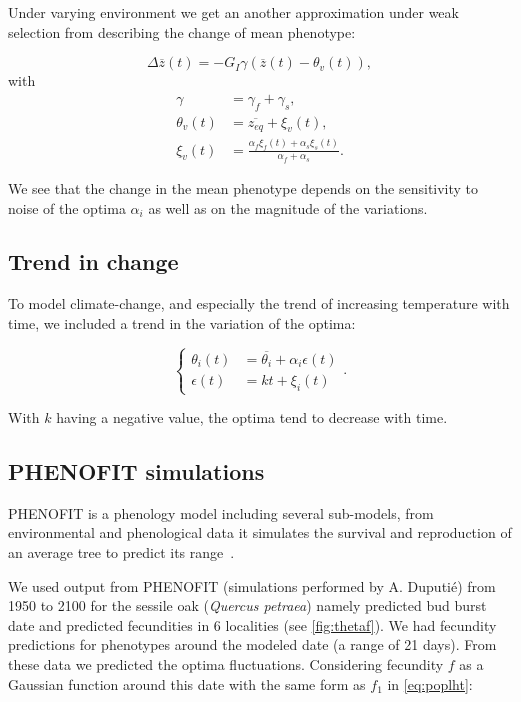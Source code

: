 Under varying environment we get an another approximation under weak selection from \citep{engen_evolution_2011} describing the change of mean phenotype:

\begin{equation}
	\label{eq:zfluct}
	\Delta \overline{z}(t) = - G_I \gamma (\overline{z}(t) - \theta_v(t)),
\end{equation}
with
\begin{subequations}
	\begin{align}
		\gamma &= \gamma_f + \gamma_s, \\
		\theta_v(t) &= \overline{z_{eq}} + \xi_v(t), \\
		\xi_v(t) &= \frac{\alpha_f \xi_f(t) + \alpha_s \xi_s(t)}{\alpha_f + \alpha_s}.
	\end{align}
\end{subequations}

We see that the change in the mean phenotype depends on the sensitivity to noise of the optima $\alpha_i$ as well as on the magnitude of the variations.

\subsection*{Trend in change}

To model climate-change, and especially the trend of increasing temperature with time, we included a trend in the variation of the optima:

\begin{equation}
	\label{eq:kt}
	\left\{
	\begin{aligned}
		\theta_i(t) &= \overline{\theta_i} + \alpha_i\epsilon(t) \\
		\epsilon(t) &= kt + \xi_i(t)
	\end{aligned}
	\right..
\end{equation}

With $k$ having a negative value, the optima tend to decrease with time.

\subsection*{\textsc{PHENOFIT} simulations}

\textsc{PHENOFIT} is a phenology model including several sub-models, from environmental and phenological data it simulates the survival and reproduction of an average tree to predict its range~\citep{morin_tree_2008}.

 We used output from \textsc{PHENOFIT} (simulations performed by A. Duputié) from 1950 to 2100 for the sessile oak (\textit{Quercus petraea}) namely predicted bud burst date and predicted fecundities in 6 localities (see \autoref{fig:thetaf}). We had fecundity predictions for phenotypes around the modeled date (a range of 21 days). From these data we predicted the optima fluctuations. Considering fecundity $f$ as a Gaussian function around this date with the same form as $f_1$ in \autoref{eq:poplht}:

